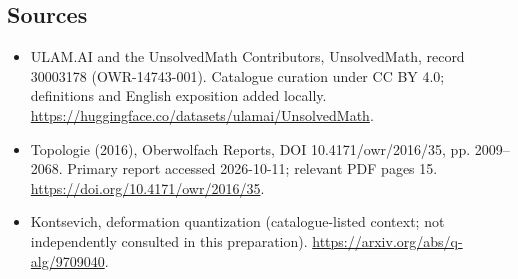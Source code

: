 \documentclass[11pt]{article}
\begin{document}
\subsection{Sources}
\begin{itemize}
\item[\hypertarget{source:30003178:1}{S1}] ULAM.AI and the UnsolvedMath Contributors, UnsolvedMath, record 30003178 (OWR-14743-001). Catalogue curation under CC BY 4.0; definitions and English exposition added locally.
\url{https://huggingface.co/datasets/ulamai/UnsolvedMath}.
\item[\hypertarget{source:30003178:2}{S2}] Topologie (2016), Oberwolfach Reports, DOI 10.4171/owr/2016/35, pp. 2009--2068. Primary report accessed 2026-10-11; relevant PDF pages 15.
\url{https://doi.org/10.4171/owr/2016/35}.
\item[\hypertarget{source:30003178:3}{S3}] Kontsevich, deformation quantization (catalogue-listed context; not independently consulted in this preparation).
\url{https://arxiv.org/abs/q-alg/9709040}.
\end{itemize}
\label{end:30003178}
\end{document}
